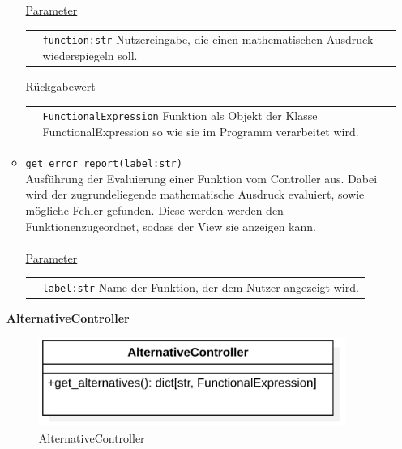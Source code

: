 \documentclass{article}
\begin{document}
\begin{itemize}
\begin{itemize}
\underline{{Parameter}}\\
\begin{tabular}{lp{10.7cm}}
 & \texttt{function:str}  Nutzereingabe, die einen mathematischen Ausdruck wiederspiegeln soll. \\
\end{tabular}
\newline\newline
\underline{{Rückgabewert}}\\
\begin{tabular}{lp{10.7cm}}
 & \texttt{FunctionalExpression} Funktion als Objekt der Klasse FunctionalExpression so wie sie im Programm verarbeitet wird. \\
\end{tabular}


\item \texttt{get\_error\_report(label:str)}\\ Ausführung der Evaluierung einer Funktion vom Controller aus. Dabei wird der zugrundeliegende mathematische Ausdruck evaluiert, sowie mögliche Fehler gefunden. Diese werden werden den Funktionenzugeordnet, sodass der View sie anzeigen kann. \\\\
\underline{{Parameter}}\\
\begin{tabular}{lp{10.7cm}}
 & \texttt{label:str} Name der Funktion, der dem Nutzer angezeigt wird. \\
\end{tabular}
\end{itemize}


\newpage
\textbf{\large{AlternativeController}}
\begin{figure}[H]%
    \centering
    \includegraphics[width=10cm]{entwurf/Floriane/AlternativeController.png}
    \caption{AlternativeController}
\end{figure}


\end{itemize}
\end{document}
